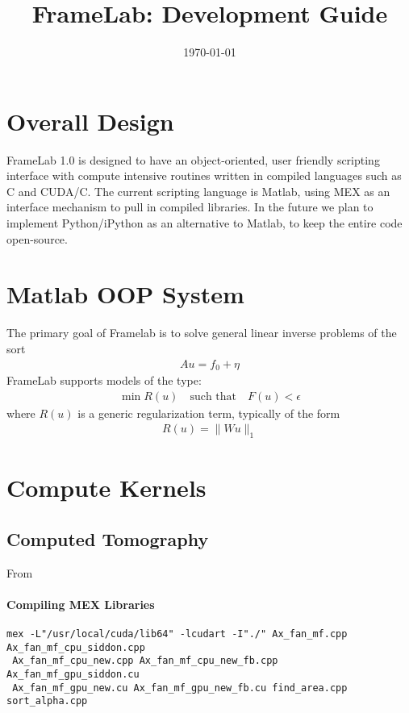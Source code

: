 \documentclass[12pt]{article}
\title{FrameLab: Development Guide}
\date{\today}
\begin{document}
\maketitle

\section{Overall Design}
FrameLab 1.0 is designed to have an object-oriented, user friendly scripting interface with compute intensive routines written in compiled languages such as C and CUDA/C.  The current scripting language is Matlab, using MEX as an interface mechanism to pull in compiled libraries.  In the future we plan to implement Python/iPython as an alternative to Matlab, to keep the entire code open-source.

\section{Matlab OOP System}
The primary goal of Framelab is to solve general linear inverse problems of the sort 
\begin{align*}
Au = f_0 + \eta 
\end{align*} FrameLab supports models of the type: 
\begin{align*}
\min R(u) \quad \text{such that}\quad F(u)<\epsilon 
\end{align*}where $R(u)$ is a generic regularization term, typically of the form 
\begin{align*}
R(u) = \|Wu\|_1
\end{align*}


\section{Compute Kernels}
\subsection{Computed Tomography}
From \cite{gaocode}

\paragraph{Compiling MEX Libraries}

\begin{verbatim}
mex -L"/usr/local/cuda/lib64" -lcudart -I"./" Ax_fan_mf.cpp Ax_fan_mf_cpu_siddon.cpp
 Ax_fan_mf_cpu_new.cpp Ax_fan_mf_cpu_new_fb.cpp Ax_fan_mf_gpu_siddon.cu 
 Ax_fan_mf_gpu_new.cu Ax_fan_mf_gpu_new_fb.cu find_area.cpp sort_alpha.cpp
\end{verbatim}
\end{document}
